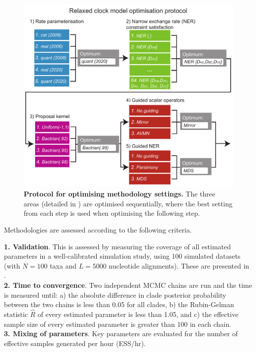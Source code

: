 \documentclass[10pt,letterpaper]{article}
\begin{document}
\begin{figure}[!h]
\includegraphics[width=\textwidth]{Figures/tournament.pdf}
\caption{\textbf{Protocol for optimising methodology settings.} The three areas (detailed in \textbf{}) are optimised sequentially, where the best setting from each step is used when optimising the following step.}
\label{fig:tournament}
\end{figure}


Methodologies are assessed according to the following criteria.


\textbf{1. Validation}. This is assessed by measuring the coverage of all estimated parameters in a well-calibrated simulation study, using 100 simulated datasets (with $N=100$ taxa and $L=5000$ nucleotide alignments). These are presented in \textbf{}. \\

\textbf{2. Time to convergence}. Two independent MCMC chains are run and the time is measured until: a) the absolute difference in clade posterior probability between the two chains is less than 0.05 for all clades, b) the Rubin-Gelman statistic $\hat{R}$ \cite{gelman1992inference} of every estimated parameter is less than 1.05, and c) the effective sample size \cite{rambaut2013tracer} of every estimated parameter is greater than 100 in each chain. \\

\textbf{3. Mixing of parameters}. Key parameters are evaluated for the number of effective samples generated per hour (ESS/hr). \\
\end{document}
